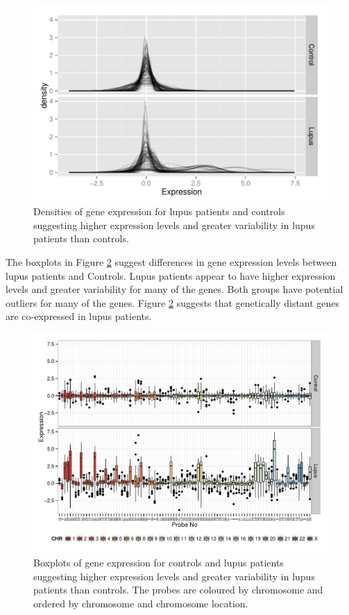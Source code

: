 \documentclass[a4paper, 12pt]{report}
\begin{document}
\begin{figure}[H]
\begin{centering}
\includegraphics[width=\textwidth]{densities.pdf}
\caption{Densities of gene expression for lupus patients and controls suggesting higher expression levels and greater variability in lupus patients than controls.} 
\label{F:Density}
\end{centering}
\end{figure}

The boxplots in Figure \ref{F:Box} suggest differences in gene expression levels between lupus patients and \gls{Control}s. \gls{Lupus} patients appear to have higher expression levels and greater variability for many of the genes. Both groups have potential outliers for many of the genes. Figure \ref{F:Box} suggests that genetically distant genes are co-expressed in lupus patients.

\begin{figure}[H]
\begin{centering}
\includegraphics[width=\textwidth]{boxAll.pdf}
\caption{Boxplots of gene expression for controls and lupus patients suggesting higher expression levels and greater variability in lupus patients than controls. The probes are coloured by chromosome and ordered by chromosome and chromosome location.} 
\label{F:Box}
\end{centering}
\end{figure}
\end{document}
